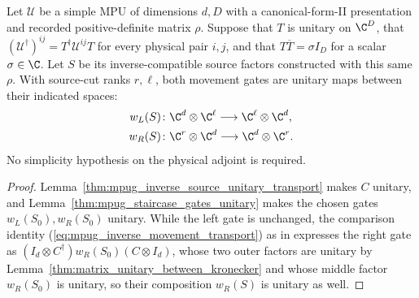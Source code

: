 \begin{lemma}
    \label{thm:mpug_inverse_movement_unitary}
    \leanok
    Let $\mathcal U$ be a simple MPU of dimensions $d,D$ with a
    canonical-form-II presentation and recorded positive-definite matrix
    $\rho$. Suppose that $T$ is unitary on $\C^D$, that
    $(\mathcal U^\dagger)^{ij}=T^\dagger\mathcal U^{ij}T$ for every
    physical pair $i,j$, and that $T\overline T=\sigma I_D$ for a scalar
    $\sigma\in\C$. Let $S$ be its inverse-compatible source factors
    constructed with this same $\rho$. With source-cut ranks $r,\ell$,
    both movement gates are unitary maps between their indicated spaces:
    \begin{align}
        w_L(S) & \colon\C^d\otimes\C^\ell\longrightarrow\C^\ell\otimes\C^d, \\
        w_R(S) & \colon\C^r\otimes\C^d\longrightarrow\C^d\otimes\C^r.
    \end{align}
    No simplicity hypothesis on the physical adjoint is required.
\end{lemma}
\begin{proof}\leanok
    Lemma~\ref{thm:mpug_inverse_source_unitary_transport} makes $C$
    unitary, and Lemma~\ref{thm:mpug_staircase_gates_unitary} makes the
    chosen gates $w_L(S_0),w_R(S_0)$ unitary. While the left gate is unchanged,
    the comparison identity (\ref{eq:mpug_inverse_movement_transport}) as in
    \cite[lines~5486--5487]{FrancoRubio2025MPUGauging} expresses the right gate
    as $(I_d\otimes C^\dagger)w_R(S_0)(C\otimes I_d)$, whose two outer factors
    are unitary by Lemma~\ref{thm:matrix_unitary_between_kronecker} and whose
    middle factor $w_R(S_0)$ is unitary, so their composition $w_R(S)$ is
    unitary as well.
\end{proof}

